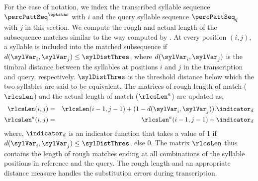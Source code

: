 For the ease of notation, we index the transcribed syllable sequence $\percPattSeq^{\optstar}$ with $i$ and the query syllable sequence $\percPattSeq_q$ with $j$ in this section. We compute the rough and actual length of the subsequence matches similar to the way computed by . At every position $(i,j)$, a syllable is included into the matched subsequence if $d(\sylVar_i,\sylVar_j) \leq \sylDistThres$, where $d(\sylVar_i,\sylVar_j)$ is the timbral distance between the syllables at positions $i$ and $j$ in the transcription and query, respectively. $\sylDistThres$ is the threshold distance below which the two syllables are said to be equivalent. The matrices of rough length of match ($\rlcsLen$) and the actual length of match ($\rlcsLen^a$) are updated as,
\begin{eqnarray}
\rlcsLen(i,j) &=& \rlcsLen(i-1,j-1) + (1-d(\sylVar_i,\sylVar_j)) . \indicator_d \label{eq:rlcs:roughLength}\\
\rlcsLen^a(i,j) &=& \rlcsLen^a(i-1,j-1) + \indicator_d \label{eq:rlcs:trueLength}
\end{eqnarray}
where, $\indicator_d$ is an indicator function that takes a value of 1 if $d(\sylVar_i,\sylVar_j) \leq \sylDistThres$, else 0. The matrix $\rlcsLen$ thus contains the length of rough matches ending at all combinations of the syllable positions in reference and the query. The rough length and an appropriate distance measure handles the substitution errors during transcription. 

